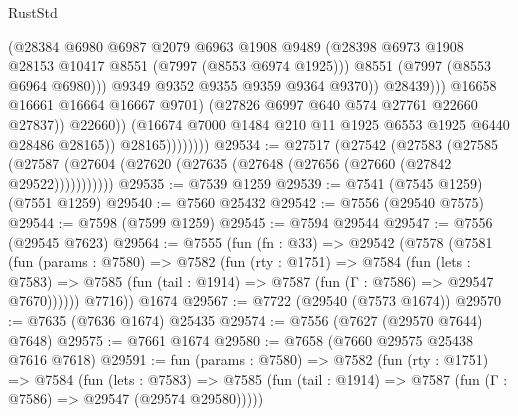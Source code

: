 \begin{lexlean}{RustStd}
\begin{coremodule}
{\begin{coremodule}
{{{{{{{{{{{{{{{{{{{{{{{{{{{{{{{{{{{{{{{{{{{                                        (@28384
                                          @6980
                                          @6987
                                          @2079
                                          @6963
                                          @1908
                                          @9489
                                          (@28398
                                            @6973
                                            @1908
                                            @28153
                                            @10417
                                            @8551
                                            (@7997 (@8553 @6974 @1925)))
                                          @8551
                                          (@7997 (@8553 @6964 @6980)))
                                        @9349
                                        @9352
                                        @9355
                                        @9359
                                        @9364
                                        @9370))
                                    @28439)))
                              @16658
                              @16661
                              @16664
                              @16667
                              @9701)
                            (@27826 @6997 @640 @574 @27761 @22660 @27837))
                          @22660))
                      (@16674 @7000 @1484 @210 @11 @1925 @6553 @1925 @6440 @28486 @28165))
                    @28165))))))))
@29534 := @27517
    (@27542
      (@27583
        (@27585 (@27587 (@27604 (@27620 (@27635 (@27648 (@27656 (@27660 (@27842 @29522)))))))))))
@29535 := @7539 @1259
@29539 := @7541 (@7545 @1259) (@7551 @1259)
@29540 := @7560 @25432
@29542 := @7556 (@29540 @7575)
@29544 := @7598 (@7599 @1259)
@29545 := @7594 @29544
@29547 := @7556 (@29545 @7623)
@29564 := @7555
    (fun (fn : @33) =>
    @29542
      (@7578
        (@7581
          (fun (params : @7580) =>
          @7582
            (fun (rty : @1751) =>
            @7584
              (fun (lets : @7583) =>
              @7585 (fun (tail : @1914) => @7587 (fun (Γ : @7586) => @29547 @7670))))))
        @7716))
    @1674
@29567 := @7722 (@29540 (@7573 @1674))
@29570 := @7635 (@7636 @1674) @25435
@29574 := @7556 (@7627 (@29570 @7644) @7648)
@29575 := @7661 @1674
@29580 := @7658 (@7660 @29575 @25438 @7616 @7618)
@29591 := fun (params : @7580) =>
  @7582
    (fun (rty : @1751) =>
    @7584
      (fun (lets : @7583) =>
      @7585 (fun (tail : @1914) => @7587 (fun (Γ : @7586) => @29547 (@29574 @29580)))))
}}}}}}}}}}}}}}}}}}}}}}}}}}}}}}}}}}}}}}}}}}}
\end{coremodule}}
\end{coremodule}
\end{lexlean}
